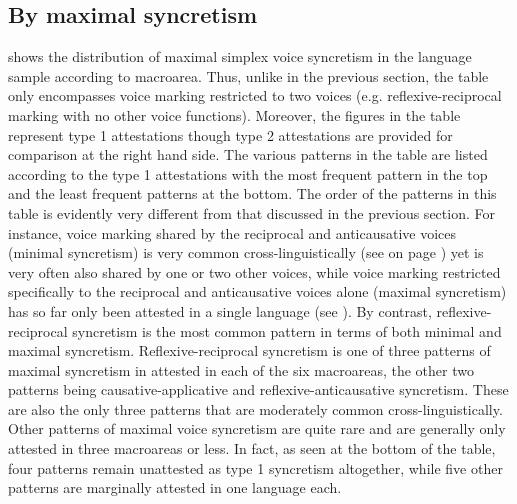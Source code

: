 \subsection{By maximal syncretism} \label{dist:maximal} %
 shows the distribution of maximal simplex voice syncretism in the language sample according to macroarea. Thus, unlike in the previous section, the table only encompasses voice marking restricted to two voices (e.g.  reflexive-reciprocal marking  with no other voice functions). Moreover, the figures in the table represent type 1 attestations though type 2 attestations are provided for comparison at the right hand side. The various patterns in the table are listed according to the type 1 attestations with the most frequent pattern in the top and the least frequent patterns at the bottom. The order of the patterns in this table is evidently very different from that discussed in the previous section. For instance, voice marking shared by the reciprocal and anticausative voices (minimal syncretism) is very common cross-linguistically (see  on page \pageref{tab:ch6:voice-syncretism-macroarea-minimal}) yet is very often also shared by one or two other voices, while voice marking restricted specifically to the reciprocal and anticausative voices alone (maximal syncretism) has so far only been attested in a single language (see ). By contrast, reflexive-reciprocal syncretism is the most common pattern in terms of both minimal and maximal syncretism. Reflexive-reciprocal syncretism is one of three patterns of maximal syncretism in  attested in each of the six macroareas, the other two patterns being causative-applicative and reflexive-anticausative syncretism. These are also the only three patterns that are moderately common cross-linguistically. Other patterns of maximal voice syncretism are quite rare and are generally only attested in three macroareas or less. In fact, as seen at the bottom of the table, four patterns remain unattested as type 1 syncretism altogether, while five other patterns are marginally attested in one language each.

